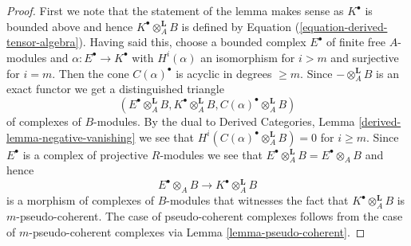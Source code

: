 \documentclass[10pt,a4paper]{amsart}
\theoremstyle{plain}
\theoremstyle{definition}
\theoremstyle{remark}
\numberwithin{equation}{subsection}
\begin{document}
\begin{proof}
First we note that the statement of the lemma makes sense as
$K^\bullet$ is bounded above and hence $K^\bullet \otimes_A^{\mathbf{L}} B$
is defined by Equation (\ref{equation-derived-tensor-algebra}).
Having said this, choose a bounded complex $E^\bullet$
of finite free $A$-modules and $\alpha : E^\bullet \to K^\bullet$
with $H^i(\alpha)$ an isomorphism for $i > m$ and surjective for
$i = m$. Then the cone $C(\alpha)^\bullet$ is acyclic in degrees
$\geq m$. Since $-\otimes_A^{\mathbf{L}} B$ is an exact functor
we get a distinguished triangle
$$
(E^\bullet \otimes_A^{\mathbf{L}} B, K^\bullet \otimes_A^{\mathbf{L}} B,
C(\alpha)^\bullet \otimes_A^{\mathbf{L}} B)
$$
of complexes of $B$-modules. By the dual to
Derived Categories, Lemma \ref{derived-lemma-negative-vanishing}
we see that $H^i(C(\alpha)^\bullet \otimes_A^{\mathbf{L}} B) = 0$
for $i \geq m$. Since $E^\bullet$ is a complex of projective $R$-modules
we see that $E^\bullet \otimes_A^{\mathbf{L}} B = E^\bullet \otimes_A B$
and hence
$$
E^\bullet \otimes_A B
\longrightarrow
K^\bullet \otimes_A^{\mathbf{L}} B
$$
is a morphism of complexes of $B$-modules that witnesses the
fact that $K^\bullet \otimes_A^{\mathbf{L}} B$ is $m$-pseudo-coherent.
The case of pseudo-coherent complexes follows from the case
of $m$-pseudo-coherent complexes via
Lemma \ref{lemma-pseudo-coherent}.
\end{proof}
\end{document}
